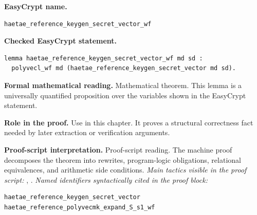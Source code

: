 \begin{formaltheorem}
\noindent\textbf{EasyCrypt name.}
\begin{lstlisting}[language=EasyCrypt,basicstyle=\ttfamily\scriptsize]
haetae_reference_keygen_secret_vector_wf
\end{lstlisting}
\noindent\textbf{Checked EasyCrypt statement.}
\begin{lstlisting}[language=EasyCrypt,basicstyle=\ttfamily\scriptsize]
lemma haetae_reference_keygen_secret_vector_wf md sd :
  polyvecl_wf md (haetae_reference_keygen_secret_vector md sd).
\end{lstlisting}
\noindent\textbf{Formal mathematical reading.}
Mathematical theorem. This lemma is a universally quantified proposition over the variables shown in the EasyCrypt statement.

\noindent\textbf{Role in the proof.}
Use in this chapter. It proves a structural correctness fact needed by later extraction or verification arguments.

\noindent\textbf{Proof-script interpretation.}
Proof-script reading. The machine proof decomposes the theorem into rewrites, program-logic obligations, relational equivalences, and arithmetic side conditions.
\emph{Main tactics visible in the proof script:} , .
\emph{Named identifiers syntactically cited in the proof block:}
\begin{lstlisting}[language=EasyCrypt,basicstyle=\ttfamily\scriptsize]
haetae_reference_keygen_secret_vector
haetae_reference_polyvecmk_expand_S_s1_wf
\end{lstlisting}

\end{formaltheorem}

